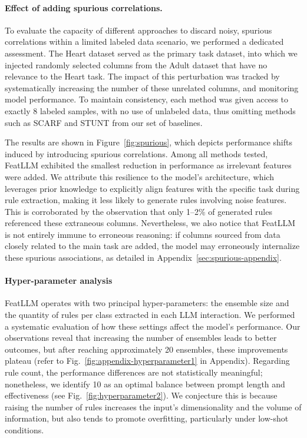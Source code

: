 \paragraph{Effect of adding spurious correlations.} To evaluate the capacity of different approaches to discard noisy, spurious correlations within a limited labeled data scenario, we performed a dedicated assessment. The Heart dataset served as the primary task dataset, into which we injected randomly selected columns from the Adult dataset that have no relevance to the Heart task. The impact of this perturbation was tracked by systematically increasing the number of these unrelated columns, and monitoring model performance. To maintain consistency, each method was given access to exactly 8 labeled samples, with no use of unlabeled data, thus omitting methods such as SCARF and STUNT from our set of baselines. 

The results are shown in Figure~\ref{fig:spurious}, which depicts performance shifts induced by introducing spurious correlations. Among all methods tested, \textsf{FeatLLM} exhibited the smallest reduction in performance as irrelevant features were added. We attribute this resilience to the model’s architecture, which leverages prior knowledge to explicitly align features with the specific task during rule extraction, making it less likely to generate rules involving noise features. This is corroborated by the observation that only 1–2\% of generated rules referenced these extraneous columns. Nevertheless, we also notice that \textsf{FeatLLM} is not entirely immune to erroneous reasoning: if columns sourced from data closely related to the main task are added, the model may erroneously internalize these spurious associations, as detailed in Appendix~\ref{sec:spurious-appendix}.

\vspace*{-0.12in}
\paragraph{Hyper-parameter analysis}
\textsf{FeatLLM} operates with two principal hyper-parameters: the ensemble size and the quantity of rules per class extracted in each LLM interaction. We performed a systematic evaluation of how these settings affect the model's performance. Our observations reveal that increasing the number of ensembles leads to better outcomes, but after reaching approximately 20 ensembles, these improvements plateau (refer to Fig.~\ref{fig:appendix-hyperparameter1} in Appendix). Regarding rule count, the performance differences are not statistically meaningful; nonetheless, we identify 10 as an optimal balance between prompt length and effectiveness (see Fig.~\ref{fig:hyperparameter2}). We conjecture this is because raising the number of rules increases the input’s dimensionality and the volume of information, but also tends to promote overfitting, particularly under low-shot conditions.

